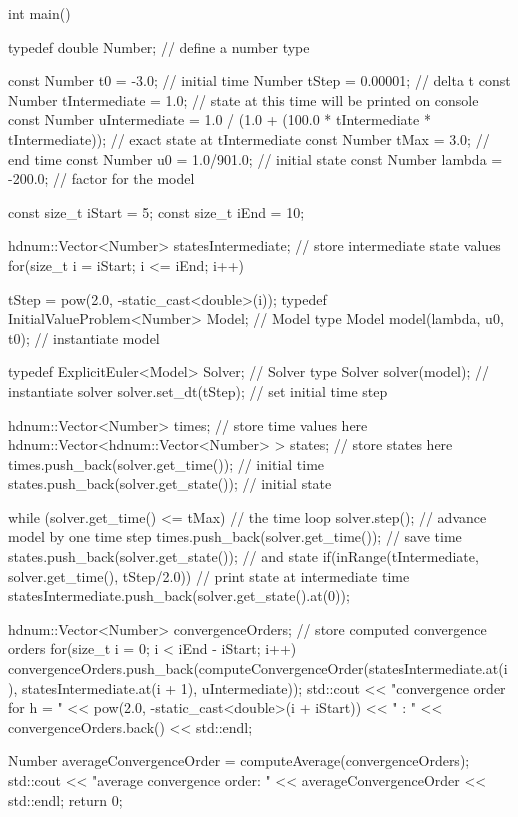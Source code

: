 \documentclass[10pt,oneside,a4paper]{scrartcl}
\begin{document}
    \begin{cppcode}
int main() {
    typedef double Number;                  // define a number type

    const Number t0             = -3.0;     // initial time
          Number tStep          = 0.00001;  // delta t
    const Number tIntermediate  = 1.0;      // state at this time will be printed on console
    const Number uIntermediate  = 1.0 / (1.0 + (100.0 * tIntermediate * tIntermediate)); // exact state at tIntermediate
    const Number tMax           = 3.0;       // end time
    const Number u0             = 1.0/901.0; // initial state
    const Number lambda         = -200.0;    // factor for the model

    const size_t iStart         = 5;
    const size_t iEnd           = 10;

    hdnum::Vector<Number> statesIntermediate;     // store intermediate state values
    for(size_t i = iStart; i <= iEnd; i++) {
      tStep = pow(2.0, -static_cast<double>(i));
      typedef InitialValueProblem<Number> Model; // Model type
      Model model(lambda, u0, t0);               // instantiate model

      typedef ExplicitEuler<Model> Solver;       // Solver type
      Solver solver(model);                      // instantiate solver
      solver.set_dt(tStep);                      // set initial time step

      hdnum::Vector<Number> times;               // store time values here
      hdnum::Vector<hdnum::Vector<Number> > states; // store states here
      times.push_back(solver.get_time());        // initial time
      states.push_back(solver.get_state());      // initial state

      while (solver.get_time() <= tMax)          // the time loop
      {
        solver.step();                           // advance model by one
        time step times.push_back(solver.get_time()); // save time
        states.push_back(solver.get_state());         // and state
        if(inRange(tIntermediate, solver.get_time(), tStep/2.0)) {  // print state at intermediate time
          statesIntermediate.push_back(solver.get_state().at(0)); 
        }
      }
    }

    hdnum::Vector<Number> convergenceOrders;     // store computed convergence orders
    for(size_t i = 0; i < iEnd - iStart; i++) {
      convergenceOrders.push_back(computeConvergenceOrder(statesIntermediate.at(i), statesIntermediate.at(i + 1), uIntermediate));
      std::cout << "convergence order for h = " << pow(2.0, -static_cast<double>(i + iStart)) << " : " << convergenceOrders.back() << std::endl;
    }

    Number averageConvergenceOrder = computeAverage(convergenceOrders);
    std::cout << "average convergence order: " << averageConvergenceOrder << std::endl;
    return 0;
}
    \end{cppcode}
    
\end{document}
